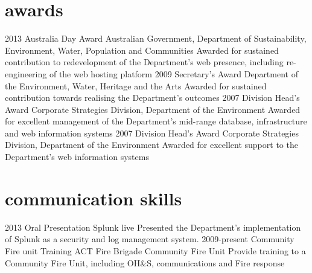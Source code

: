 \documentclass{resume} %
\begin{document}
\section{awards}
\begin{entrylist}
\entry
{2013}
{Australia Day Award}
{Australian Government, Department of Sustainability, Environment, Water, Population and Communities}
{Awarded for sustained contribution to redevelopment of the Department's web presence, including re-engineering of the web hosting platform}
\entry
{2009}
{Secretary's Award}
{Department of the Environment, Water, Heritage and the Arts}
{Awarded for sustained contribution towards realising the Department's outcomes}
\entry
{2007}
{Division Head's Award}
{Corporate Strategies Division, Department of the Environment}
{Awarded for excellent management of the Department's mid-range database, infrastructure and web information systems}
\entry
{2007}
{Division Head's Award}
{Corporate Strategies Division, Department of the Environment}
{Awarded for excellent support to the Department's web information systems}
\end{entrylist}


\section{communication skills}

\begin{entrylist}
\entry
{2013}
{Oral Presentation}
{Splunk live}
{Presented the Department's implementation of Splunk as a security and log management system.}
\entry
{2009-present}
{Community Fire unit Training}
{ACT Fire Brigade Community Fire Unit}
{Provide training to a Community Fire Unit, including OH\&S, communications and Fire response}
\end{entrylist}

\end{document}
